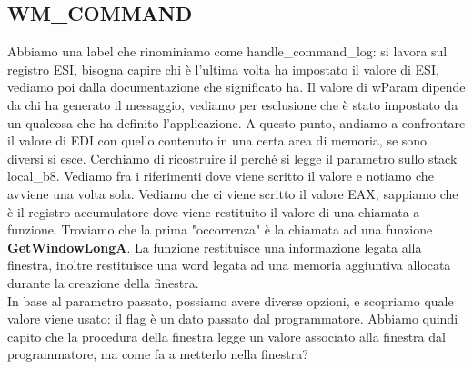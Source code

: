 \documentclass[12pt, oneside]{extbook}
\begin{document}
\subsection{WM\_COMMAND}
Abbiamo una label che rinominiamo come handle\_command\_log: si lavora sul registro ESI, bisogna capire chi è l'ultima volta ha impostato il valore di ESI, vediamo poi dalla documentazione che significato ha. Il valore di wParam dipende da chi ha generato il messaggio, vediamo per esclusione che è stato impostato da un qualcosa che ha definito l'applicazione. A questo punto, andiamo a confrontare il valore di EDI con quello contenuto in una certa area di memoria, se sono diversi si esce. Cerchiamo di ricostruire il perché si legge il parametro sullo stack local\_b8. Vediamo fra i riferimenti dove viene scritto il valore e notiamo che avviene una volta sola. Vediamo che ci viene scritto il valore EAX, sappiamo che è il registro accumulatore dove viene restituito il valore di una chiamata a funzione. Troviamo che la prima "occorrenza" è la chiamata ad una funzione \textbf{GetWindowLongA}. La funzione restituisce una informazione legata alla finestra, inoltre restituisce una word legata ad una memoria aggiuntiva allocata durante la creazione della finestra.\\ In base al parametro passato, possiamo avere diverse opzioni, e scopriamo quale valore viene usato: il flag è un dato passato dal programmatore. Abbiamo quindi capito che la procedura della finestra legge un valore associato alla finestra dal programmatore, ma come fa a metterlo nella finestra? 
\end{document}
